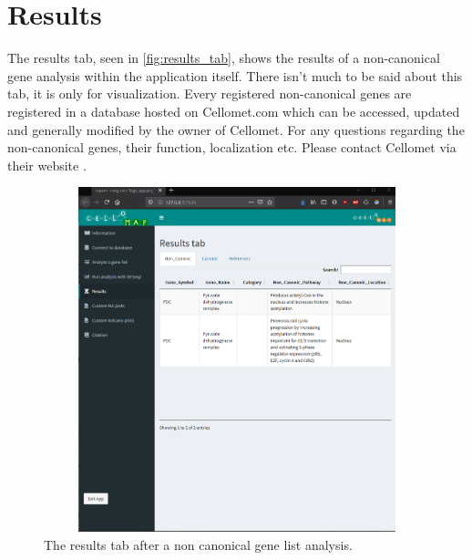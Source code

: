 \documentclass[11pt]{article}
\begin{document}
\section{Results \label{res}}
The results tab, seen in \autoref{fig:results_tab}, shows the results of a non-canonical gene analysis within the application itself. There isn't much to be said about this tab, it is only for visualization.
Every registered non-canonical genes are registered in a database hosted on Cellomet.com which can be accessed, updated and generally modified by the owner of Cellomet. For any questions regarding the non-canonical genes, their function, localization etc. Please contact Cellomet via their website \cite{Cellomet}.

\begin{figure}[h!]
\centering
\includegraphics[width=15cm,height=10cm,keepaspectratio]{results_tab.png}
\caption{The results tab after a non canonical gene list analysis.}
\label{fig:results_tab}
\end{figure}
\end{document}
